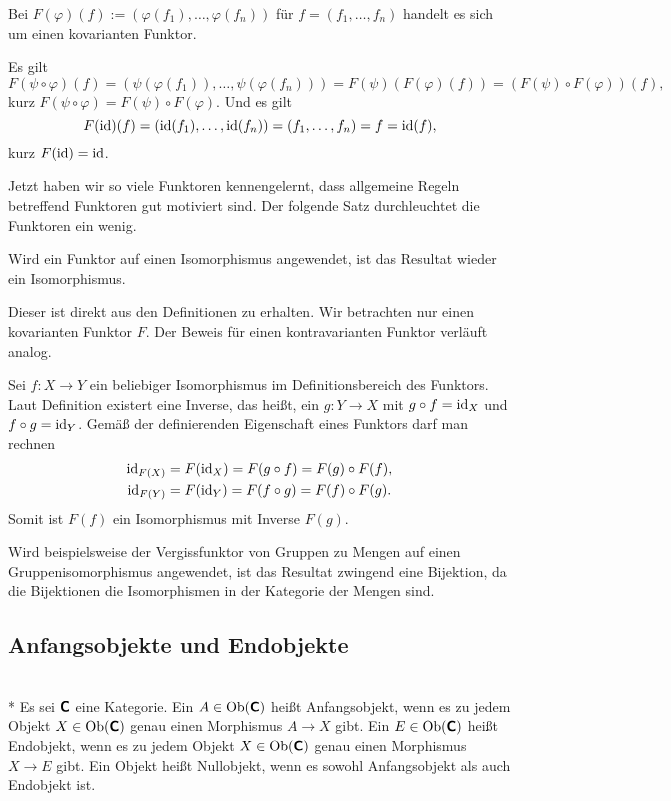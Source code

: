 \begin{Satz}
Bei $F(\varphi)(f):=(\varphi(f_1),\ldots,\varphi(f_n))$ für
$f=(f_1,\ldots,f_n)$ handelt es sich um einen kovarianten Funktor.
\end{Satz}
 Es gilt
\[F(\psi\circ\varphi)(f) = (\psi(\varphi(f_1)),\ldots,\psi(\varphi(f_n)))
= F(\psi)(F(\varphi)(f))
= (F(\psi)\circ F(\varphi))(f),\]
kurz $F(\psi\circ\varphi) = F(\psi)\circ F(\varphi)$. Und es gilt
\[F(\operatorname{id})(f) = (\operatorname{id}(f_1),\ldots,\operatorname{id}(f_n)) = (f_1,\ldots,f_n) = f = \operatorname{id}(f),\]
kurz $F(\operatorname{id}) = \operatorname{id}$.\;\qedsymbol

Jetzt haben wir so viele Funktoren kennengelernt, dass allgemeine
Regeln betreffend Funktoren gut motiviert sind. Der folgende Satz
durchleuchtet die Funktoren ein wenig.
\begin{Satz}
Wird ein Funktor auf einen Isomorphismus angewendet, ist das Resultat
wieder ein Isomorphismus.
\end{Satz}
 Dieser ist direkt aus den Definitionen zu erhalten.
Wir betrachten nur einen kovarianten Funktor $F$. Der Beweis für
einen kontravarianten Funktor verläuft analog.

Sei $f\colon X\to Y$ ein beliebiger Isomorphismus im Definitionsbereich
des Funktors. Laut Definition existert eine Inverse, das heißt, ein
$g\colon Y\to X$ mit $g\circ f = \operatorname{id}_X$ und $f\circ g = \operatorname{id}_Y$. Gemäß
der definierenden Eigenschaft eines Funktors darf man rechnen
\begin{gather*}
\operatorname{id}_{F(X)} = F(\operatorname{id}_X) = F(g\circ f) = F(g)\circ F(f),\\
\operatorname{id}_{F(Y)} = F(\operatorname{id}_Y) = F(f\circ g) = F(f)\circ F(g).
\end{gather*}
Somit ist $F(f)$ ein Isomorphismus mit Inverse $F(g)$.\,\qedsymbol

Wird beispielsweise der Vergissfunktor von Gruppen zu Mengen auf
einen Gruppenisomorphismus angewendet, ist das Resultat zwingend
eine Bijektion, da die Bijektionen die Isomorphismen in der Kategorie
der Mengen sind.

\subsection{Anfangsobjekte und Endobjekte}

\begin{Definition}\mbox{}\\*
Es sei $\textsf{\textbf{C}}$ eine Kategorie. Ein
$A\in\operatorname{Ob}(\textsf{\textbf{C}})$ heißt Anfangsobjekt, wenn
es zu jedem Objekt $X\in\operatorname{Ob}(\textsf{\textbf{C}})$ genau einen
Morphismus $A\to X$ gibt.
Ein $E\in\operatorname{Ob}(\textsf{\textbf{C}})$ heißt Endobjekt, wenn
es zu jedem Objekt $X\in\operatorname{Ob}(\textsf{\textbf{C}})$ genau einen
Morphismus $X\to E$ gibt. Ein Objekt heißt Nullobjekt, wenn
es sowohl Anfangsobjekt als auch Endobjekt ist.
\end{Definition}

